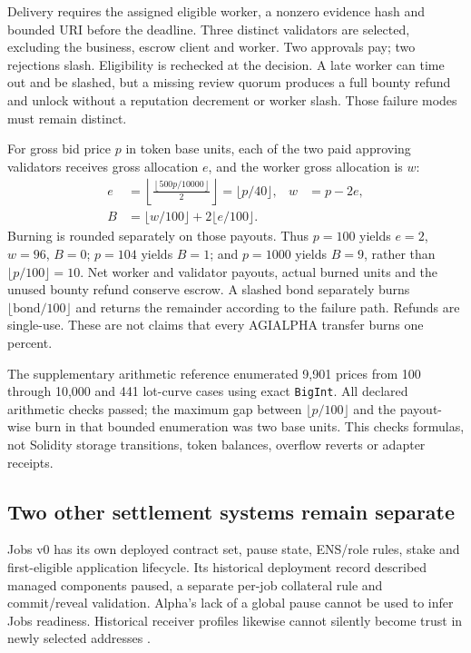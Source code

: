 \documentclass[11pt,letterpaper]{article}
\theoremstyle{definition}\newtheorem{definition}[theorem]{Definition}
\theoremstyle{remark}\newtheorem{remark}[theorem]{Remark}
\begin{document}
Delivery requires the assigned eligible worker, a nonzero evidence hash and bounded URI before the deadline. Three distinct validators are selected, excluding the business, escrow client and worker. Two approvals pay; two rejections slash. Eligibility is rechecked at the decision. A late worker can time out and be slashed, but a missing review quorum produces a full bounty refund and unlock without a reputation decrement or worker slash. Those failure modes must remain distinct.

For gross bid price \(p\) in token base units, each of the two paid approving validators receives gross allocation \(e\), and the worker gross allocation is \(w\):
\begin{align}
 e&=\left\lfloor\frac{\left\lfloor500p/10000\right\rfloor}{2}\right\rfloor
   =\lfloor p/40\rfloor,& w&=p-2e, \label{eq:alloc}\\
 B&=\lfloor w/100\rfloor+2\lfloor e/100\rfloor . \label{eq:burn}
\end{align}
Burning is rounded separately on those payouts. Thus \(p=100\) yields \(e=2\), \(w=96\), \(B=0\); \(p=104\) yields \(B=1\); and \(p=1000\) yields \(B=9\), rather than \(\lfloor p/100\rfloor=10\). Net worker and validator payouts, actual burned units and the unused bounty refund conserve escrow. A slashed bond separately burns \(\lfloor\text{bond}/100\rfloor\) and returns the remainder according to the failure path. Refunds are single-use. These are not claims that every AGIALPHA transfer burns one percent.

The supplementary arithmetic reference enumerated 9,901 prices from 100 through 10,000 and 441 lot-curve cases using exact \texttt{BigInt}. All declared arithmetic checks passed; the maximum gap between \(\lfloor p/100\rfloor\) and the payout-wise burn in that bounded enumeration was two base units. This checks formulas, not Solidity storage transitions, token balances, overflow reverts or adapter receipts.

\subsection{Two other settlement systems remain separate}
Jobs v0 has its own deployed contract set, pause state, ENS/role rules, stake and first-eligible application lifecycle. Its historical deployment record described managed components paused, a separate per-job collateral rule and commit/reveal validation. Alpha's lack of a global pause cannot be used to infer Jobs readiness. Historical receiver profiles likewise cannot silently become trust in newly selected addresses \citep{jobs}.
\end{document}

